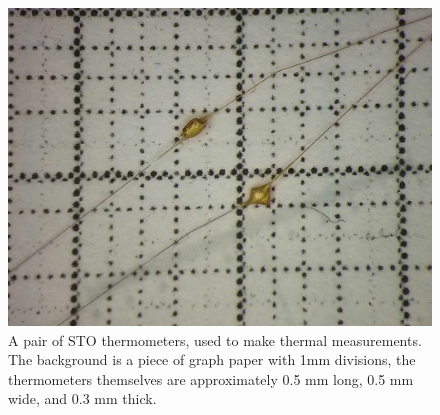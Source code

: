\documentclass{thesis-umich}
\begin{document}

\begin{figure} \caption[A pair of STO thermometers]{A pair of STO thermometers, used to make thermal
  measurements. The background is a piece of graph paper with 1mm divisions, the
thermometers themselves are approximately 0.5 mm long, 0.5 mm wide, and 0.3 mm
thick.} \label{fig:thermo_pic}\centering
\includegraphics[width=\columnwidth]{figures/thermometers_apl.jpg}
\end{figure}
\end{document}
